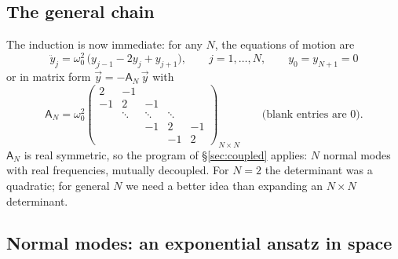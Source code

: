 \documentclass[11pt]{article}
\theoremstyle{plain}
\theoremstyle{definition}
\theoremstyle{remark}
\newcommand{\mA}{\mathsf{A}}
\begin{document}
\subsection{The general chain}

The induction is now immediate: for any $N$, the equations of motion are
\begin{equation}
  \boxed{\;
  \ddot y_j = \omega_0^2\,\bigl(y_{j-1} - 2y_j + y_{j+1}\bigr),
  \qquad j = 1,\dots,N,
  \qquad y_0 = y_{N+1} = 0
  \;}
  \label{eq:chain-eom}
\end{equation}
or in matrix form $\ddot{\vec y} = -\mA_N\,\vec y$ with
\begin{equation}
  \mA_N = \omega_0^2
  \begin{pmatrix}
    2 & -1 & & & \\
    -1 & 2 & -1 & & \\
     & \ddots & \ddots & \ddots & \\
     & & -1 & 2 & -1\\
     & & & -1 & 2
  \end{pmatrix}_{N\times N}
  \qquad\text{(blank entries are $0$)}.
\end{equation}
$\mA_N$ is real symmetric, so the program of \S\ref{sec:coupled} applies: $N$
normal modes with real frequencies, mutually decoupled. For $N=2$ the
determinant was a quadratic; for general $N$ we need a better idea than
expanding an $N\times N$ determinant.

\subsection{Normal modes: an exponential ansatz in space}
\label{sec:chain-modes}
\end{document}
